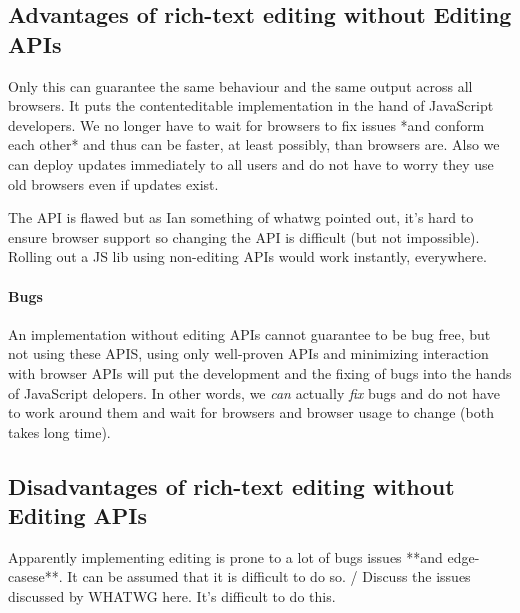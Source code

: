 
\subsection{Advantages of rich-text editing without Editing APIs}

Only this can guarantee the same behaviour and the same output across all browsers.
It puts the contenteditable implementation in the hand of JavaScript developers. We no longer have to wait for browsers to fix issues *and conform each other* and thus can be faster, at least possibly, than browsers are.
Also we can deploy updates immediately to all users and do not have to worry they use old browsers even if updates exist.

The API is flawed but as Ian something of whatwg pointed out, it's hard to ensure browser support so changing the API is difficult (but not impossible). Rolling out a JS lib using non-editing APIs would work instantly, everywhere.

\paragraph{Bugs} An implementation without editing APIs cannot guarantee to be bug free, but not using these APIS, using only well-proven APIs and minimizing interaction with browser APIs will put the development and the fixing of bugs into the hands of JavaScript delopers. In other words, we \textit{can} actually \textit{fix} bugs and do not have to work around them and wait for browsers and browser usage to change (both takes long time).

\subsection{Disadvantages of rich-text editing without Editing APIs}

Apparently implementing editing is prone to a lot of bugs issues **and edge-casese**. It can be assumed that it is difficult to do so. / Discuss the issues discussed by WHATWG here. It's difficult to do this.

